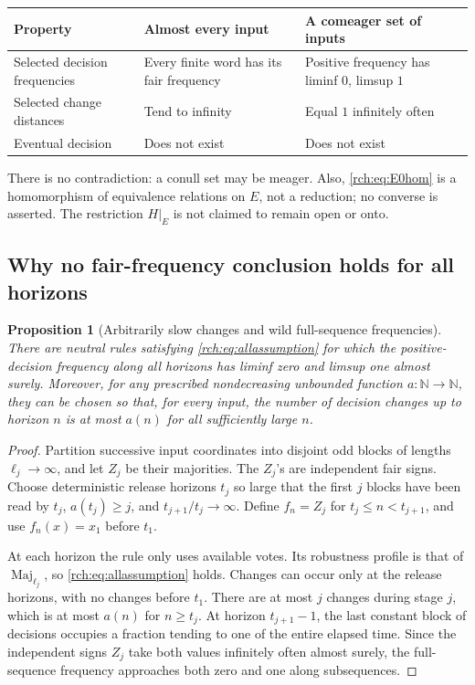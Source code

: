 \documentclass[11pt]{article}
\newtheorem{proposition}[theorem]{Proposition}
\theoremstyle{definition}
\theoremstyle{remark}
\newcommand{\N}{\mathbb N}
\newcommand{\Maj}{\operatorname{Maj}}
\begin{document}
\begin{center}
\begin{tabularx}{\textwidth}{@{}P{0.25\textwidth}YY@{}}
\toprule
Property & Almost every input & A comeager set of inputs\\
\midrule
Selected decision frequencies & Every finite word has its fair frequency &
Positive frequency has liminf \(0\), limsup \(1\)\\[4pt]
Selected change distances & Tend to infinity & Equal \(1\) infinitely often\\[4pt]
Eventual decision & Does not exist & Does not exist\\
\bottomrule
\end{tabularx}
\end{center}

There is no contradiction: a conull set may be meager. Also,
\eqref{rch:eq:E0hom} is a homomorphism of equivalence relations on \(E\), not
a reduction; no converse is asserted. The restriction \(H|_E\) is not claimed
to remain open or onto.

\subsection{Why no fair-frequency conclusion holds for all horizons}

\begin{proposition}[Arbitrarily slow changes and wild full-sequence frequencies]
\label{rch:prop:slow}
There are neutral rules satisfying \eqref{rch:eq:allassumption} for which the
positive-decision frequency along \emph{all} horizons has liminf zero and
limsup one almost surely. Moreover, for any prescribed nondecreasing unbounded
function \(a:\N\to\N\), they can be chosen so that, for every input,
the number of decision changes up to horizon \(n\) is at most \(a(n)\)
for all sufficiently large \(n\).
\end{proposition}

\begin{proof}
Partition successive input coordinates into disjoint odd blocks of lengths
\(\ell_j\to\infty\), and let \(Z_j\) be their majorities. The \(Z_j\)'s
are independent fair signs. Choose deterministic release horizons \(t_j\)
so large that the first \(j\) blocks have been read by \(t_j\),
\(a(t_j)\ge j\), and \(t_{j+1}/t_j\to\infty\). Define \(f_n=Z_j\)
for \(t_j\le n<t_{j+1}\), and use \(f_n(x)=x_1\) before \(t_1\).

At each horizon the rule only uses available votes. Its robustness profile is
that of \(\Maj_{\ell_j}\), so \eqref{rch:eq:allassumption} holds. Changes can
occur only at the release horizons, with no changes before \(t_1\).
There are at most \(j\) changes during stage \(j\), which is at most
\(a(n)\) for \(n\ge t_j\). At horizon \(t_{j+1}-1\), the
last constant block of decisions occupies a fraction tending to one of the
entire elapsed time. Since the independent signs \(Z_j\) take both values
infinitely often almost surely, the full-sequence frequency approaches both
zero and one along subsequences.
\end{proof}
\end{document}
